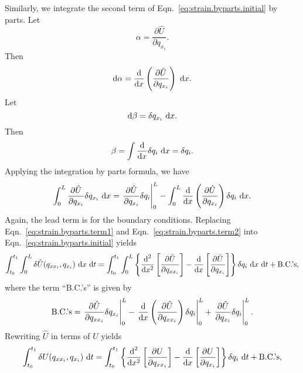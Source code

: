 Similarly, we integrate the second term of Eqn.~\ref{eq:strain.byparts.initial} by parts. Let
\begin{equation}
\alpha = \frac{\partial \hat U}{\partial q_{x_i}}.
\end{equation}
Then 
\begin{equation}
\text d\alpha = \frac{\text d}{\text dx}\left(\frac{\partial \hat U}{\partial q_{x_i}}\right)\text{ d}x.
\end{equation}
Let
\begin{equation}
\text d\beta = \delta q_{x_i}\text{ d}x.
\end{equation}
Then
\begin{equation}
\beta = \int \frac{\text d}{\text dx}\delta q_i\text{ d}x = \delta q_i.
\end{equation}
Applying the integration by parts formula, we have
\begin{equation}
\int_0^L\frac{\partial \hat U}{\partial q_{x_i}}\delta q_{x_i}\text{ d}x = \left.\frac{\partial \hat U}{\partial q_{x_i}}\delta q_i\right|_0^L - \int_0^L \frac{\text d}{\text dx}\left(\frac{\partial \hat U}{\partial q_{x_i}}\right)\delta q_i\text{ d}x.
\label{eq:strain.byparts.term2}
\end{equation}
Again, the lead term is for the boundary conditions. Replacing Eqn.~\ref{eq:strain.byparts.term1} and Eqn.~\ref{eq:strain.byparts.term2} into Eqn.~\ref{eq:strain.byparts.initial} yields
\begin{equation}
\int_{t_0}^{t_1}\int_0^L\delta \hat U(q_{xx_i},q_{x_i})\text{ d}x\text{ d}t = \int_{t_0}^{t_1} \int_0^L \left\lbrace\frac{\text d^2}{\text dx^2}\left[\frac{\partial \hat{U}}{\partial q_{xx_i}}\right]-\frac{\text d}{\text dx}\left[\frac{\partial \hat U}{\partial q_{x_i}}\right]\right\rbrace\delta q_i\text{ d}x\text{ d}t + \text{B.C.'s},
\end{equation}
where the term ``B.C.'s'' is given by
\begin{equation}
\text{B.C.'s} = \left.\frac{\partial \hat U}{\partial q_{xx_i}}\delta q_{x_i}\right|_0^L-\left.\frac{\text d}{\text dx}\left(\frac{\partial \hat{U}}{\partial q_{xx_i}}\right)\delta q_i\right|_0^L + \left.\frac{\partial \hat U}{\partial q_{x_i}}\delta q_i\right|_0^L.
\end{equation}
Rewriting $\hat U$ in terms of $U$ yields
\begin{equation}
\int_{t_0}^{t_1}\delta U(q_{xx_i},q_{x_i})\text{ d}t = \int_{t_0}^{t_1} \left\lbrace\frac{\text d^2}{\text dx^2}\left[\frac{\partial U}{\partial q_{xx_i}}\right]-\frac{\text d}{\text dx}\left[\frac{\partial  U}{\partial q_{x_i}}\right]\right\rbrace\delta q_i\text{ d}t + \text{B.C.'s},
\end{equation}
